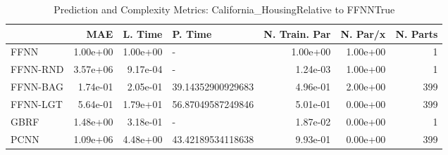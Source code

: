 \begin{table}
\centering
\caption{Prediction and Complexity Metrics: California_HousingRelative to FFNNTrue}
\label{tab__California_Housing__Fix_Neurons_QTrue}
\begin{tabular}{lrrlrrr}
\toprule
{} &      MAE &  L. Time &            P. Time &  N. Train. Par &  N. Par/x &  N. Parts \\
\midrule
FFNN     & 1.00e+00 & 1.00e+00 &                  - &       1.00e+00 &  1.00e+00 &         1 \\
FFNN-RND & 3.57e+06 & 9.17e-04 &                  - &       1.24e-03 &  1.00e+00 &         1 \\
FFNN-BAG & 1.74e-01 & 2.05e-01 &  39.14352900929683 &       4.96e-01 &  2.00e+00 &       399 \\
FFNN-LGT & 5.64e-01 & 1.79e+01 &  56.87049587249846 &       5.01e-01 &  0.00e+00 &       399 \\
GBRF     & 1.48e+00 & 3.18e-01 &                  - &       1.87e-02 &  0.00e+00 &         1 \\
PCNN     & 1.09e+06 & 4.48e+00 &  43.42189534118638 &       9.93e-01 &  0.00e+00 &       399 \\
\bottomrule
\end{tabular}
\end{table}
